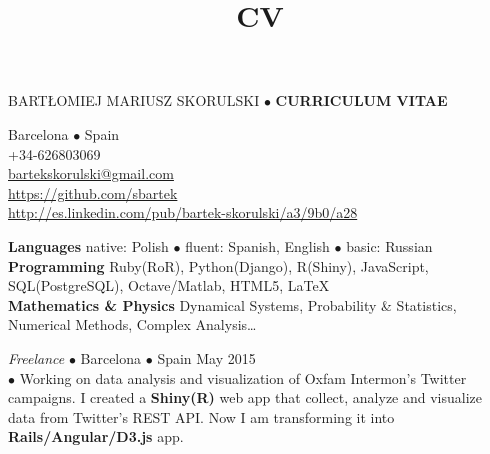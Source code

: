 \documentclass[a4paper, twoside]{scrreprt}
\title{CV}
\author{}
\date{}
\begin{document}
\noindent BARTŁOMIEJ MARIUSZ SKORULSKI $\bullet$ \textbf{CURRICULUM VITAE}
\vspace{-0.3cm}

\noindent\makebox[\linewidth]{\rule{\textwidth}{0.4pt}}

\vspace{0.2cm}

{\small
\noindent\llap{\FA \faHome\ \ } Barcelona $\bullet$ Spain\\
\noindent\llap{\FA \faMobilePhone\ \ \ }+34-626803069\\
\noindent\llap{\FA \faEnvelope\ \ } \href{mailto:bartekskorulski@gmail.com}{bartekskorulski@gmail.com}\\
\noindent\llap{\FA \faGithub\ \ }
\href{https://github.com/sbartek}{https://github.com/sbartek}\\
\noindent\llap{\FA \faLinkedin\ \ }
\href{http://es.linkedin.com/pub/bartek-skorulski/a3/9b0/a28}{http://es.linkedin.com/pub/bartek-skorulski/a3/9b0/a28}

\noindent\makebox[\linewidth]{\rule{\textwidth}{0.4pt}}

\vspace{0.2cm}

\noindent\llap{\FA \faComments\ \ }\textbf{Languages} native: Polish $\bullet$ fluent: Spanish, English  $\bullet$ basic: Russian \\
\noindent\llap{\FA \faKeyboard\ \ }\textbf{Programming} Ruby(RoR),  Python(Django),  R(Shiny), JavaScript, SQL(PostgreSQL), Octave/Matlab, HTML5, \LaTeX\\
\noindent\llap{\FA \faSuperscript\ \ }\textbf{Mathematics \& Physics} Dynamical Systems, Probability \& Statistics, Numerical Methods, 
Complex Analysis\ldots

\noindent\makebox[\linewidth]{\rule{\textwidth}{0.4pt}}

\vspace{0.2cm}

\noindent{}\textit{Freelance} $\bullet$ 
Barcelona $\bullet$ Spain \hfill May 2015\\
 $\bullet$
{\small Working on data analysis and visualization of Oxfam Intermon's
  Twitter campaigns. I created a \textbf{Shiny(R)} web app that collect,
  analyze and visualize data from Twitter's REST API. Now I am
  transforming it into \textbf{Rails/Angular/D3.js} app.}\\

}
\end{document}
